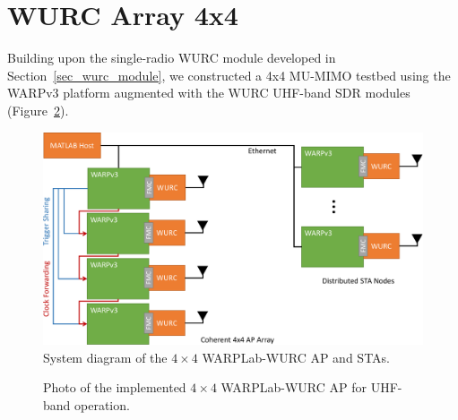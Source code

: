 \section{WURC Array 4x4}
\label{sec_wurc_4x4}

	Building upon the single-radio \ac{WURC} module developed in Section~\ref{sec_wurc_module}, we constructed a 4x4 \ac{MU-MIMO} testbed using the WARPv3 platform augmented with the \ac{WURC} UHF-band \ac{SDR} modules (Figure~\ref{fig_wurc_4x4_testbed}).
	
	
\begin{figure}[p] 
\centering
\includegraphics[width=0.9\linewidth]{./figs/wurc/wurc_warplab_sys_diagram}
\caption{System diagram of the $4\times4$ WARPLab-WURC \ac{AP} and \acp{STA}.}
\label{fig_wurc_4x4_sys_diagram}
\end{figure}

\begin{figure}[p]
\centering        
\caption{Photo of the implemented $4\times4$ WARPLab-WURC \ac{AP} for UHF-band operation.
\label{fig_wurc_4x4_testbed}}
\end{figure}
	
